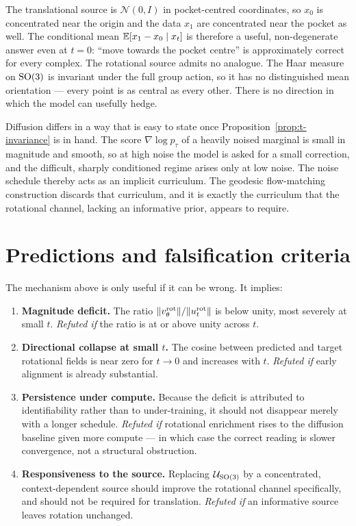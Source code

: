 The translational source is $\mathcal{N}(0, I)$ in pocket-centred coordinates,
so $x_0$ is concentrated near the origin and the data $x_1$ are concentrated
near the pocket as well. The conditional mean $\mathbb{E}[x_1 - x_0 \mid x_t]$ is
therefore a useful, non-degenerate answer even at $t=0$: ``move towards the
pocket centre'' is approximately correct for every complex. The rotational
source admits no analogue. The Haar measure on $\mathrm{SO}(3)$ is invariant under
the full group action, so it has no distinguished mean orientation --- every
point is as central as every other. There is no direction in which the model
can usefully hedge.

Diffusion differs in a way that is easy to state once
Proposition~\ref{prop:t-invariance} is in hand. The score $\nabla\log p_\tau$
of a heavily noised marginal is small in magnitude and smooth, so at high noise
the model is asked for a small correction, and the difficult, sharply
conditioned regime arises only at low noise. The noise schedule thereby acts
as an implicit curriculum. The geodesic flow-matching construction discards
that curriculum, and it is exactly the curriculum that the rotational channel,
lacking an informative prior, appears to require.

\section{Predictions and falsification criteria}
\label{sec:predictions}

The mechanism above is only useful if it can be wrong. It implies:

\begin{enumerate}[label=\textbf{P\arabic*},leftmargin=*,itemsep=2pt]
\item \textbf{Magnitude deficit.} The ratio
      $\|v_\theta^{\mathrm{rot}}\| / \|u_t^{\mathrm{rot}}\|$ is below unity,
      most severely at small $t$. \emph{Refuted if} the ratio is at or above
      unity across $t$.
\item \textbf{Directional collapse at small $t$.} The cosine between predicted
      and target rotational fields is near zero for $t \to 0$ and increases
      with $t$. \emph{Refuted if} early alignment is already substantial.
\item \textbf{Persistence under compute.} Because the deficit is attributed to
      identifiability rather than to under-training, it should not disappear
      merely with a longer schedule. \emph{Refuted if} rotational enrichment
      rises to the diffusion baseline given more compute --- in which case the
      correct reading is slower convergence, not a structural obstruction.
\item \textbf{Responsiveness to the source.} Replacing $\mathcal{U}_{\mathrm{SO}(3)}$ by a
      concentrated, context-dependent source should improve the rotational
      channel specifically, and should not be required for translation.
      \emph{Refuted if} an informative source leaves rotation unchanged.
\end{enumerate}

